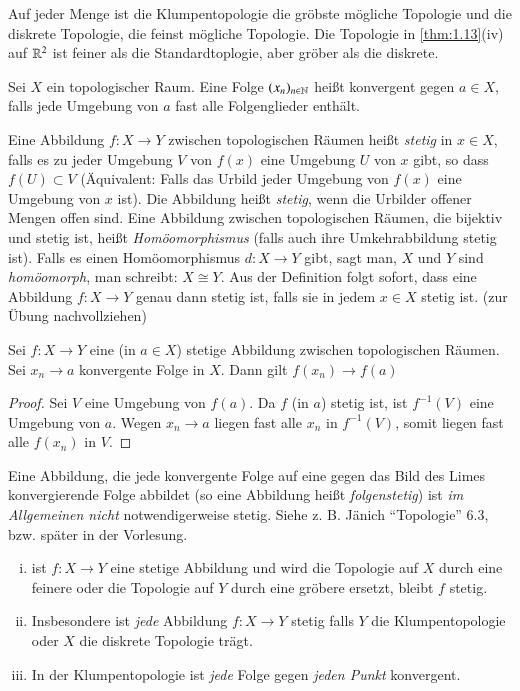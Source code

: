 \documentclass[a4paper,10pt]{scrartcl}
\newcommand{\homo}{\cong}
\begin{document}
Auf jeder Menge ist die Klumpentopologie die gröbste mögliche Topologie und die diskrete Topologie, die feinst mögliche Topologie.  Die Topologie in \ref{thm:1.13}(iv) auf $ \mathbb{R}^2 $ ist feiner als die Standardtoplogie, aber gröber als die diskrete.

\begin{df}
Sei $ X $ ein topologischer Raum.  Eine Folge $ (x_n)_{n \in \mathbb{N}} $ heißt konvergent gegen $ a\in X $, falls jede Umgebung von $ a $ fast alle Folgenglieder enthält.
\end{df}
\begin{df}\label{thm:1.16}
Eine Abbildung $ f:X\to Y $ zwischen topologischen Räumen heißt \emph{stetig} in $ x\in X $, falls es zu jeder Umgebung $ V $ von $ f(x) $ eine Umgebung $ U $ von $ x $ gibt,
 so dass $ f(U)\subset V $ (Äquivalent: Falls das Urbild jeder Umgebung von $ f(x) $ eine Umgebung von $ x $ ist). Die Abbildung heißt \emph{stetig}, wenn die Urbilder offener Mengen offen sind. 
Eine Abbildung zwischen topologischen Räumen, die bijektiv und stetig ist, heißt \emph{Homöomorphismus} (falls auch ihre Umkehrabbildung stetig ist).  Falls es einen Homöomorphismus $ d: X\to Y $ gibt, sagt man, $ X $ und $ Y $ sind \emph{homöomorph}, man schreibt: $ X\homo Y $.
Aus der Definition folgt sofort, dass eine Abbildung $ f: X\to Y $ genau dann stetig ist, falls sie in jedem $ x\in X $ stetig ist. (zur Übung nachvollziehen)
\end{df}
\begin{st}\label{thm:1.17}
Sei $ f: X\to Y $ eine (in $ a\in X $) stetige Abbildung zwischen topologischen Räumen.  Sei $ x_n\to a $ konvergente Folge in $ X $. Dann gilt $ f(x_n) \to f(a) $
\end{st}
\begin{proof}
Sei $ V $ eine Umgebung von $ f(a) $. Da $ f $ (in $ a $) stetig ist, ist $ f^{-1}(V) $ eine Umgebung von $a$.  Wegen $ x_n\to a $ liegen fast alle $ x_n $ in $f^{-1}(V)$,
 somit liegen fast alle $f(x_n)$ in $ V $.
\end{proof}
\begin{att}
Eine Abbildung, die jede konvergente Folge auf eine gegen das Bild des Limes konvergierende Folge abbildet (so eine Abbildung heißt \emph{folgenstetig}) ist \emph{im Allgemeinen nicht}
 notwendigerweise stetig. Siehe z. B. Jänich "`Topologie"' 6.3, bzw. später in der Vorlesung.
\end{att}
\begin{ex*}
\begin{enumerate}[(i)]
\item ist $ f: X\to Y $ eine stetige Abbildung und wird die Topologie auf $ X $ durch eine feinere oder die Topologie auf $ Y $ durch eine gröbere ersetzt, bleibt $ f $ stetig.
\item Insbesondere ist \emph{jede} Abbildung $ f: X\to Y $ stetig falls $ Y $ die Klumpentopologie oder $ X $ die diskrete Topologie trägt.
\item In der Klumpentopologie ist \emph{jede} Folge gegen \emph{jeden Punkt} konvergent. 
\end{enumerate}
\end{ex*}
\end{document}
